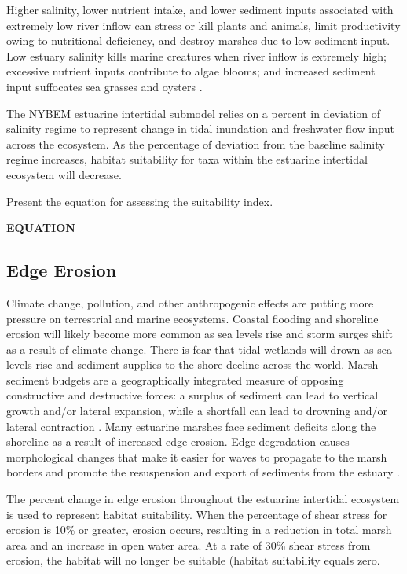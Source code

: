 \documentclass[
]{book}
\begin{document}
Higher salinity, lower nutrient intake, and lower sediment inputs associated with extremely low river inflow can stress or kill plants and animals, limit productivity owing to nutritional deficiency, and destroy marshes due to low sediment input. Low estuary salinity kills marine creatures when river inflow is extremely high; excessive nutrient inputs contribute to algae blooms; and increased sediment input suffocates sea grasses and oysters \citep{hopkinson_lateral_2018}.

The NYBEM estuarine intertidal submodel relies on a percent in deviation of salinity regime to represent change in tidal inundation and freshwater flow input across the ecosystem. As the percentage of deviation from the baseline salinity regime increases, habitat suitability for taxa within the estuarine intertidal ecosystem will decrease.

Present the equation for assessing the suitability index.

\textbf{EQUATION}

\hypertarget{edge-erosion}{%
\subsection{Edge Erosion}\label{edge-erosion}}

Climate change, pollution, and other anthropogenic effects are putting more pressure on terrestrial and marine ecosystems. Coastal flooding and shoreline erosion will likely become more common as sea levels rise and storm surges shift as a result of climate change. There is fear that tidal wetlands will drown as sea levels rise and sediment supplies to the shore decline across the world. Marsh sediment budgets are a geographically integrated measure of opposing constructive and destructive forces: a surplus of sediment can lead to vertical growth and/or lateral expansion, while a shortfall can lead to drowning and/or lateral contraction \citep{ganju_spatially_2017}. Many estuarine marshes face sediment deficits along the shoreline as a result of increased edge erosion. Edge degradation causes morphological changes that make it easier for waves to propagate to the marsh borders and promote the resuspension and export of sediments from the estuary \citep{li_wave-driven_2019}.

The percent change in edge erosion throughout the estuarine intertidal ecosystem is used to represent habitat suitability. When the percentage of shear stress for erosion is 10\% or greater, erosion occurs, resulting in a reduction in total marsh area and an increase in open water area. At a rate of 30\% shear stress from erosion, the habitat will no longer be suitable (habitat suitability equals zero.
\end{document}
